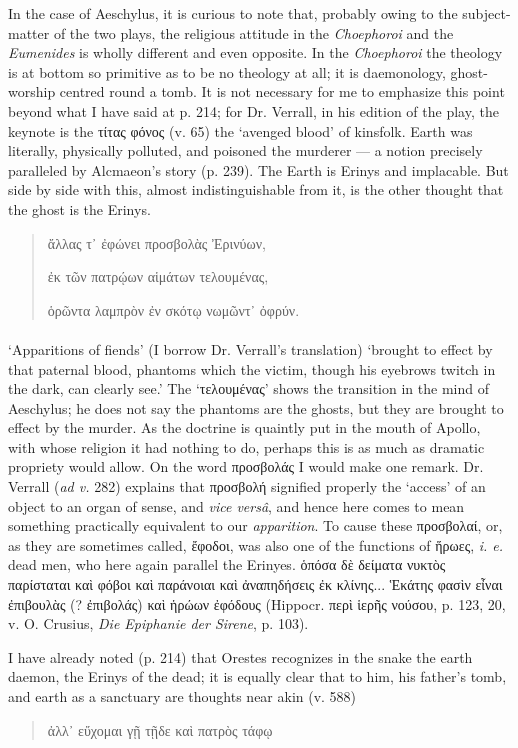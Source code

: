 \documentclass[a4paper, 11pt, oneside, polutonikogreek, english]{article}
\begin{document}
In the case of Aeschylus, it is curious to note that, probably owing to the subject-matter of the two plays, the religious attitude in the \emph{Choephoroi} and the \emph{Eumenides} is wholly different and even opposite. In the \emph{Choephoroi} the theology is at bottom so primitive as to be no theology at all; it is daemonology, ghost-worship centred round a tomb. It is not necessary for me to emphasize this point beyond what I have said at p. 214; for Dr. Verrall, in his edition of the play, the keynote is the τίτας φόνος (v. 65) the `avenged blood' of kinsfolk. Earth was literally, physically polluted, and poisoned the murderer --- a notion precisely paralleled by Alcmaeon's story (p. 239). The Earth is Erinys and implacable. But side by side with this, almost indistinguishable from it, is the other thought that the ghost is the Erinys.
\begin{quotation}
ἄλλας τ᾽ ἐφώνει προσβολὰς Ἐρινύων,

ἐκ τῶν πατρῴων αἱμάτων τελουμένας,

ὁρῶντα λαμπρὸν ἐν σκότῳ νωμῶντ᾽ ὀφρύν.
\end{quotation}
\paragraph{}
`Apparitions of fiends' (I borrow Dr. Verrall's translation) `brought to effect by that paternal blood, phantoms which the victim, though his eyebrows twitch in the dark, can clearly see.' The `τελουμένας' shows the transition in the mind of Aeschylus; he does not say the phantoms are the ghosts, but they are brought to effect by the murder. As the doctrine is quaintly put in the mouth of Apollo, with whose religion it had nothing to do, perhaps this is as much as dramatic propriety would allow. On the word προσβολάς I would make one remark. Dr. Verrall (\emph{ad v.} 282) explains that προσβολή signified properly the `access' of an object to an organ of sense, and \emph{vice versâ}, and hence here comes to mean something practically equivalent to our \emph{apparition}. To cause these προσβολαί, or, as they are sometimes called, ἔφοδοι, was also one of the functions of ἥρωες, \emph{i. e.} dead men, who here again parallel the Erinyes. ὁπόσα δὲ δείματα νυκτὸς παρίσταται καὶ φόβοι καὶ παράνοιαι καὶ ἀναπηδήσεις ἐκ κλίνης... Ἑκάτης φασὶν εἶναι ἐπιβουλὰς (? ἐπιβολάς) καὶ ἡρώων ἐφόδους (Hippocr. περὶ ἱερῆς νούσου, p. 123, 20, v. O. Crusius, \emph{Die Epiphanie der Sirene}, p. 103).

I have already noted (p. 214) that Orestes recognizes in the snake the earth daemon, the Erinys of the dead; it is equally clear that to him, his father's tomb, and earth as a sanctuary are thoughts near akin (v. 588)
\begin{quotation}
ἀλλ᾽ εὔχομαι γῇ τῇδε καὶ πατρὸς τάφῳ
\end{quotation}
\end{document}
